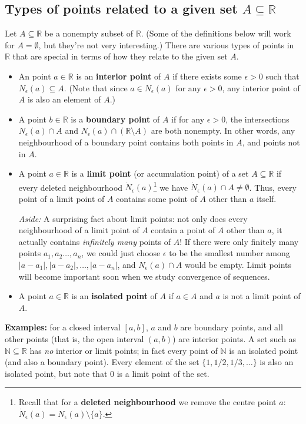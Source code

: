 \documentclass[12pt,letterpaper]{article}
\newcommand{\abs}[1]{\lvert #1\rvert}
\newcommand{\R}{\mathbb{R}}
\begin{document}
\subsection*{Types of points related to a given set $A\subseteq \R$}
Let $A\subseteq \R$ be a nonempty subset of $\R$. (Some of the definitions below will work for $A=\emptyset$, but they're not very interesting.) There are various types of points in $\R$ that are special in terms of how they relate to the given set $A$.
\begin{itemize}
\item An point $a\in \R$ is an {\bf interior point} of $A$ if there exists some $\epsilon>0$ such that $N_\epsilon(a)\subseteq A$. (Note that since $a\in N_\epsilon(a)$ for any $\epsilon>0$, any interior point of $A$ is also an element of $A$.)
\item A point $b\in \R$ is a {\bf boundary point} of $A$ if for any $\epsilon>0$, the intersections $N_\epsilon(a)\cap A$ and $N_\epsilon(a)\cap(\R\setminus A)$ are both nonempty. In other words, any neighbourhood of a boundary point contains both points in $A$, and points not in $A$. 
\item A point $a\in \R$ is a {\bf limit point} (or accumulation point) of a set $A\subseteq \R$ if every deleted neighbourhood $\dot{N}_\epsilon(a)$\footnote{Recall that for a {\bf deleted neighbourhood} we remove the centre point $a$: $\dot{N}_\epsilon(a) = N_\epsilon(a)\setminus\{a\}$.} we have $\dot{N}_{\epsilon}(a)\cap A \neq \emptyset$. Thus, every point of a limit point of $A$ contains some point of $A$ other than $a$ itself.

{\em Aside:} A surprising fact about limit points: not only does every neighbourhood of a limit point of $A$ contain a point of $A$ other than $a$, it actually contains {\em infinitely many} points of $A$! If there were only finitely many points $a_1,a_2\ldots, a_n$, we could just choose $\epsilon$ to be the smallest number among $\abs{a-a_1},\abs{a-a_2},\ldots, \abs{a-a_n}$, and $N_\epsilon(a)\cap A$ would be empty. Limit points will become important soon when we study convergence of sequences.
\item A point $a\in \R$ is an {\bf isolated point} of $A$ if $a\in A$ and $a$ is not a limit point of $A$.
\end{itemize}
{\bf Examples:} for a closed interval $[a,b]$, $a$ and $b$ are boundary points, and all other points (that is, the open interval $(a,b)$) are interior points. A set such as $\mathbb{N}\subseteq\R$ has {\em no} interior or limit points; in fact every point of $\mathbb{N}$ is an isolated point (and also a boundary point). Every element of the set $\{1,1/2, 1/3, \ldots\}$ is also an isolated point, but note that 0 is a limit point of the set.
\end{document}
